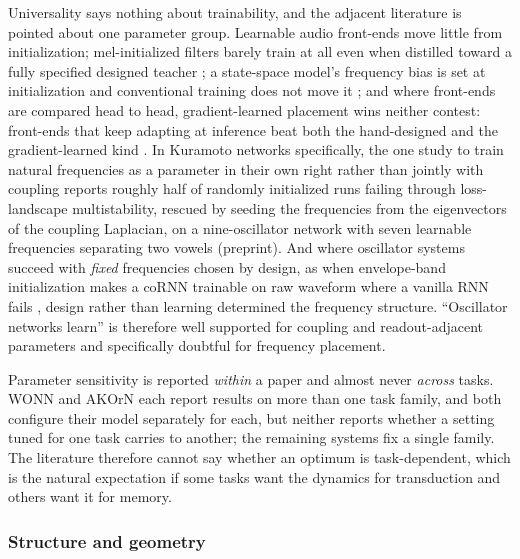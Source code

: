 \documentclass[a4paper,fleqn]{cas-sc}
\begin{document}
Universality says nothing about trainability, and the adjacent
literature is pointed about one parameter group. Learnable audio
front-ends move little from initialization; mel-initialized filters
barely train at all even when distilled toward a fully specified
designed teacher \citep{murenn}; a state-space model's frequency bias is
set at initialization and conventional training does not move it
\citep{yu2025}; and where front-ends are compared head to head,
gradient-learned placement wins neither contest: front-ends that keep
adapting at inference beat both the hand-designed and the
gradient-learned kind \citep{ada-fe, leaf-apcen}. In Kuramoto networks
specifically, the one study to train natural frequencies as a parameter
in their own right rather than jointly with coupling \citep{ahmadi2026}
reports roughly half of randomly initialized runs failing through
loss-landscape multistability, rescued by seeding the frequencies from
the eigenvectors of the coupling Laplacian, on a nine-oscillator network
with seven learnable frequencies separating two vowels (preprint). And
where oscillator systems succeed with \emph{fixed} frequencies chosen by
design, as when envelope-band initialization makes a coRNN
\citep{rusch2021} trainable on raw waveform where a vanilla RNN fails
\citep{chandravadia2026}, design rather than learning determined the
frequency structure. ``Oscillator networks learn'' is therefore well
supported for coupling and readout-adjacent parameters and specifically
doubtful for frequency placement.

Parameter sensitivity is reported \emph{within} a paper and almost never
\emph{across} tasks. WONN \citep{wonn} and AKOrN \citep{akorn} each
report results on more than one task family, and both configure their
model separately for each, but neither reports whether a setting tuned
for one task carries to another; the remaining systems fix a single
family. The literature therefore cannot say whether an optimum is
task-dependent, which is the natural expectation if some tasks want the
dynamics for transduction and others want it for memory.

\subsubsection{Structure and geometry}\label{sec-3-1-3}
\end{document}
